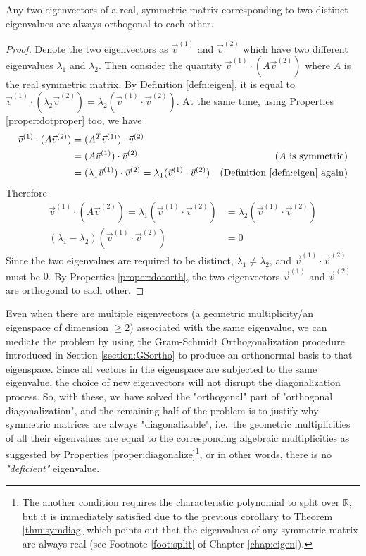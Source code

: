 \begin{proper}
\label{proper:symortho}
Any two eigenvectors of a real, symmetric matrix corresponding to two distinct eigenvalues are always orthogonal to each other.
\end{proper}
\begin{proof}
Denote the two eigenvectors as $\vec{v}^{(1)}$ and $\vec{v}^{(2)}$ which have two different eigenvalues $\lambda_1$ and $\lambda_2$. Then consider the quantity $\vec{v}^{(1)} \cdot (A\vec{v}^{(2)})$ where $A$ is the real symmetric matrix. By Definition \ref{defn:eigen}, it is equal to $\vec{v}^{(1)} \cdot (\lambda_{2}\vec{v}^{(2)}) \allowbreak = \lambda_{2}(\vec{v}^{(1)} \cdot \vec{v}^{(2)})$. At the same time, using Properties \ref{proper:dotproper} too, we have
\begin{align*}
\vec{v}^{(1)}\cdot (A\vec{v}^{(2)}) &= (A^T\vec{v}^{(1)})\cdot \vec{v}^{(2)} \\
&= (A\vec{v}^{(1)})\cdot \vec{v}^{(2)} &\text{($A$ is symmetric)} \\
&= (\lambda_1\vec{v}^{(1)})\cdot \vec{v}^{(2)} = \lambda_1(\vec{v}^{(1)} \cdot \vec{v}^{(2)}) &\text{(Definition \ref{defn:eigen} again)}
\end{align*}
Therefore
\begin{align*}
\vec{v}^{(1)} \cdot (A\vec{v}^{(2)}) =  \lambda_1(\vec{v}^{(1)} \cdot \vec{v}^{(2)}) &= \lambda_{2}(\vec{v}^{(1)}\cdot \vec{v}^{(2)}) \\
(\lambda_{1}-\lambda_{2})(\vec{v}^{(1)} \cdot \vec{v}^{(2)}) &= 0
\end{align*}
Since the two eigenvalues are required to be distinct, $\lambda_{1} \neq \lambda_{2}$, and $\vec{v}^{(1)} \cdot \vec{v}^{(2)}$ must be $0$. By Properties \ref{proper:dotorth}, the two eigenvectors $\vec{v}^{(1)}$ and $\vec{v}^{(2)}$ are orthogonal to each other.
\end{proof}
Even when there are multiple eigenvectors (a geometric multiplicity/an eigenspace of dimension $\geq 2$) associated with the same eigenvalue, we can mediate the problem by using the Gram-Schmidt Orthogonalization procedure introduced in Section \ref{section:GSortho} to produce an orthonormal basis to that eigenspace. Since all vectors in the eigenspace are subjected to the same eigenvalue, the choice of new eigenvectors will not disrupt the diagonalization process. So, with these, we have solved the "orthogonal" part of "orthogonal diagonalization", and the remaining half of the problem is to justify why symmetric matrices are always "diagonalizable", i.e.\ the geometric multiplicities of all their eigenvalues are equal to the corresponding algebraic multiplicities as suggested by Properties \ref{proper:diagonalize}\footnote{The another condition requires the characteristic polynomial to split over $\mathbb{R}$, but it is immediately satisfied due to the previous corollary to Theorem \ref{thm:symdiag} which points out that the eigenvalues of any symmetric matrix are always real (see Footnote \ref{foot:split} of Chapter \ref{chap:eigen}).}, or in other words, there is no \textit{"deficient"} eigenvalue.
